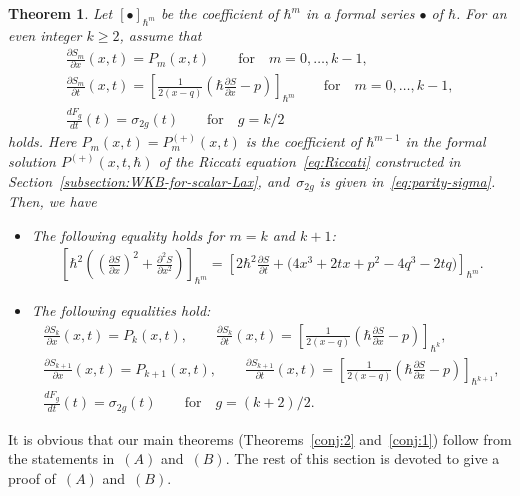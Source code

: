 \documentclass[pdftex]{sigma}
\newtheorem{thm}{Theorem}[section]
\theoremstyle{definition}
\numberwithin{equation}{section}
\def\p{\partial}
\begin{document}
\begin{thm} \label{thm:induction-scheme}
Let $[\bullet]_{\hbar^{m}}$ be the coefficient of
$\hbar^{m}$ in a formal series $\bullet$ of $\hbar$.
For an even integer $k \ge 2$, assume that
\begin{gather}
\frac{\p S_{m}}{\p x}(x,t) = P_{m}(x,t)\qquad
\text{for} \quad m=0,\dots,k-1, \nonumber\\
\frac{\p S_{m}}{\p t}(x,t) = \left[ \frac{1}{2(x-q)}\left(
\hbar \frac{\p S}{\p x} - p \right) \right]_{\hbar^{m}} \qquad
\text{for} \quad m=0,\dots,k-1, \nonumber\\
\frac{d F_{g}}{d t}(t) = \sigma_{2g}(t)  \qquad
\text{for} \quad g = k/2
\label{eq:assume-A-1}
\end{gather}
holds. Here $P_{m}(x,t) = P^{(+)}_{m}(x,t)$
is the coefficient of $\hbar^{m-1}$ in the formal solution
$P^{(+)}(x,t,\hbar)$ of the Riccati equation~\eqref{eq:Riccati}
constructed in Section~{\rm \ref{subsection:WKB-for-scalar-Lax}},
and~$\sigma_{2g}$ is given in~\eqref{eq:parity-sigma}.
Then, we have
\begin{itemize}\itemsep=0pt
\item[$(A)$] %
The following equality holds for $m = k$ and $k+1$:
\begin{gather}
\label{eq:claim-A-1}
\left[
\hbar^{2}\left( \left(\frac{\p S}{\p x}\right)^{2} +
\frac{\p^{2} S}{\p x^{2}} \right)
\right]_{\hbar^{m}}
 =  \left[ 2\hbar^{2} \frac{\p S}{\p t} +
\big(4x^{3}+2t x + p^{2} - 4q^{3}-2tq\big) \right]_{\hbar^{m}}.
\end{gather}

\item[$(B)$]
The following equalities hold:
\begin{gather}
\label{eq:claim-A-3}
\frac{\p S_{k}}{\p x}(x,t)   =   P_{k}(x,t), \qquad
\frac{\p S_{k}}{\p t}(x,t) = \left[ \frac{1}{2(x-q)}\left(
\hbar \frac{\p S}{\p x} - p \right) \right]_{\hbar^{k}}, \\
\frac{\p S_{k+1}}{\p x}(x,t)   =   P_{k+1}(x,t), \qquad
\frac{\p S_{k+1}}{\p t}(x,t) = \left[ \frac{1}{2(x-q)}\left(
\hbar \frac{\p S}{\p x} - p \right) \right]_{\hbar^{k+1}}, \label{eq:claim-B-3}
\\
\label{eq:claim-B-4}
\frac{dF_{g}}{dt}(t)   =    \sigma_{2g}(t)
\qquad \text{for} \quad g=(k+2)/2.
\end{gather}
\end{itemize}
\end{thm}

It is obvious that our main theorems (Theorems~\ref{conj:2} and~\ref{conj:1})
follow from the statements
in~$(A)$ and~$(B)$. The rest of this section is devoted to
give a proof of~$(A)$ and~$(B)$.
\end{document}
